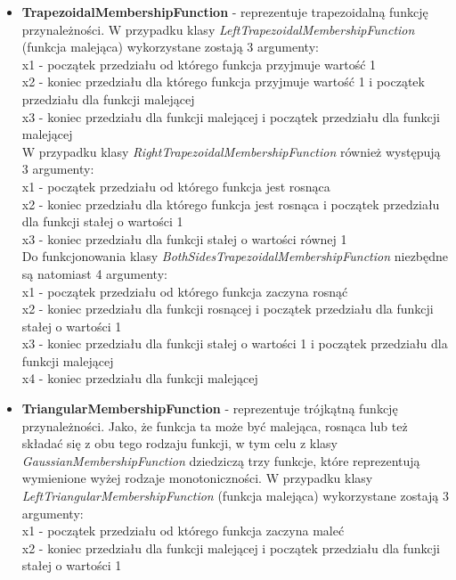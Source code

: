 \documentclass{classrep}
\begin{document}
\begin{itemize}
    \item {\bf TrapezoidalMembershipFunction} - reprezentuje trapezoidalną funkcję przynależności. W przypadku klasy \textit{LeftTrapezoidalMembershipFunction} (funkcja malejąca) wykorzystane zostają 3 argumenty: \\
    x1 - początek przedziału od którego funkcja przyjmuje wartość 1 \\
    x2 - koniec przedziału dla którego funkcja przyjmuje wartość 1 i początek przedziału dla funkcji malejącej \\
    x3 - koniec przedziału dla funkcji malejącej i początek przedziału dla funkcji malejącej \\
    W przypadku klasy \textit{RightTrapezoidalMembershipFunction} również występują 3 argumenty: \\
    x1 - początek przedziału od którego funkcja jest rosnąca \\
    x2 - koniec przedziału dla którego funkcja jest rosnąca i początek przedziału dla funkcji stałej o wartości 1 \\
    x3 - koniec przedziału dla funkcji stałej o wartości równej 1 \\
    Do funkcjonowania klasy \textit{BothSidesTrapezoidalMembershipFunction} niezbędne są natomiast 4 argumenty: \\
    x1 - początek przedziału od którego funkcja zaczyna rosnąć \\
    x2 - koniec przedziału dla funkcji rosnącej i początek przedziału dla funkcji stałej o wartości 1 \\
    x3 - koniec przedziału dla funkcji stałej o wartości 1 i początek przedziału dla funkcji malejącej \\
    x4 - koniec przedziału dla funkcji malejącej 
    \item {\bf TriangularMembershipFunction} - reprezentuje trójkątną funkcję przynależności. Jako, że funkcja ta może być malejąca, rosnąca lub też składać się z obu tego rodzaju funkcji, w tym celu z klasy \textit{GaussianMembershipFunction} dziedziczą trzy funkcje, które reprezentują wymienione wyżej rodzaje monotoniczności. W przypadku klasy \textit{LeftTriangularMembershipFunction} (funkcja malejąca) wykorzystane zostają 3 argumenty: \\
    x1 - początek przedziału od którego funkcja zaczyna maleć \\
    x2 - koniec przedziału dla funkcji malejącej i początek przedziału dla funkcji stałej o wartości 1 \\

\end{itemize}
\end{document}
